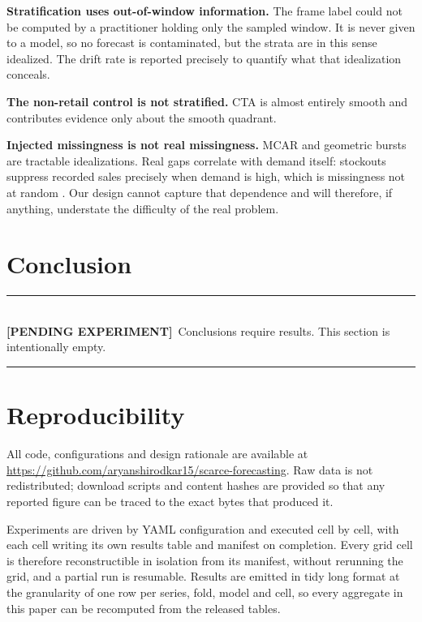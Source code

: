 \documentclass[11pt]{article}
\newcommand{\gap}[1]{%
  \par\vspace{0.6em}\noindent
  \colorbox{gapbg}{%
    \parbox{\dimexpr\linewidth-2\fboxsep}{%
      \color{gaprule}\rule{\linewidth}{0.8pt}\\[0.2em]
      \textcolor{gaprule}{\textbf{[PENDING EXPERIMENT]}}\ \color{black}#1\\[0.3em]
      \color{gaprule}\rule{\linewidth}{0.8pt}}}%
  \par\vspace{0.6em}}
\begin{document}
\textbf{Stratification uses out-of-window information.} The frame label could not
be computed by a practitioner holding only the sampled window. It is never given
to a model, so no forecast is contaminated, but the strata are in this sense
idealized. The drift rate is reported precisely to quantify what that idealization
conceals.

\textbf{The non-retail control is not stratified.} CTA is almost entirely smooth
and contributes evidence only about the smooth quadrant.

\textbf{Injected missingness is not real missingness.} MCAR and geometric bursts
are tractable idealizations. Real gaps correlate with demand itself: stockouts
suppress recorded sales precisely when demand is high, which is missingness not
at random \citep{little2019}. Our design cannot capture that dependence and will
therefore, if anything, understate the difficulty of the real problem.

\section{Conclusion}

\gap{Conclusions require results. This section is intentionally empty.}

\section*{Reproducibility}

All code, configurations and design rationale are available at
\url{https://github.com/aryanshirodkar15/scarce-forecasting}. Raw data is not
redistributed; download scripts and content hashes are provided so that any
reported figure can be traced to the exact bytes that produced it.

Experiments are driven by YAML configuration and executed cell by cell, with each
cell writing its own results table and manifest on completion. Every grid cell is
therefore reconstructible in isolation from its manifest, without rerunning the
grid, and a partial run is resumable. Results are emitted in tidy long format at
the granularity of one row per series, fold, model and cell, so every aggregate
in this paper can be recomputed from the released tables.


\end{document}
